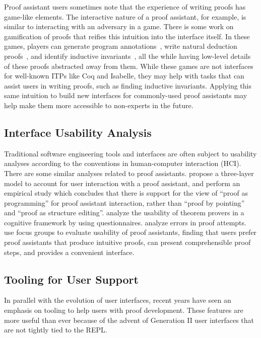 Proof assistant users sometimes note that the experience of writing proofs has game-like elements.
The interactive nature of a proof assistant, for example, is similar to interacting with an adversary in a game.
There is some work on gamification of proofs that reifies this intuition into the interface itself.
In these games, players can generate program annotations~\citep{dietl2012verification},
write natural deduction proofs~\citep{lerner2015polymorphic},
and identify inductive invariants~\citep{bounov2018inferring}, all the while having low-level details of these proofs
abstracted away from them. While these games are not interfaces for well-known ITPs like Coq and Isabelle,
they may help with tasks that can assist users in writing proofs, such as finding inductive invariants. Applying
this same intuition to build new interfaces for commonly-used proof assistants may help make them more accessible
to non-experts in the future.

\subsection{Interface Usability Analysis}
\label{sec:usability}

Traditional software engineering tools and interfaces are often subject to usability analyses according to the conventions in human-computer interaction (HCI). There are some similar analyses related to proof assistants. \cite{Aitken1998} propose a three-layer model to account for user interaction with a proof assistant, and perform an empirical study which concludes that there is support for the view of ``proof as programming'' for proof assistant interaction, rather than ``proof by pointing''~\citep{Bertot1994} and ``proof as structure editing''. \cite{Kadoda1999} analyze the usability of theorem provers in a cognitive framework by using questionnaires. \cite{Aitken2000} analyze errors in proof attempts. \cite{HOFM2014raey} use focus groups to evaluate usability of proof assistants, finding that users prefer proof assistants that produce intuitive proofs, can present comprehensible proof steps, and provides a convenient interface.

\subsection{Tooling for User Support}
\label{sec:usersupport}


In parallel with the evolution of user interfaces, recent years have seen
an emphasis on tooling to help users
with proof development. These features are more useful than ever because of the
advent of Generation II user interfaces that are not tightly tied to the REPL.

